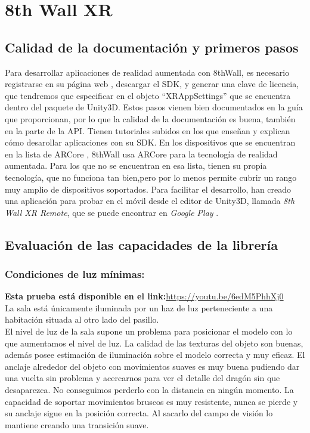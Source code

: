 \section{8th Wall XR}
\subsection{Calidad de la documentación y primeros pasos}
Para desarrollar aplicaciones de realidad aumentada con 8thWall, es necesario registrarse en su página web \cite{8thWall}, descargar el SDK, y generar una clave de licencia, que tendremos que especificar en el objeto ``XRAppSettings'' que se encuentra dentro del paquete de Unity3D. Estos pasos vienen bien documentados en la guía que proporcionan, por lo que la calidad de la documentación es buena, también en la parte de la API. Tienen tutoriales subidos en los que enseñan y explican cómo desarollar aplicaciones con su SDK. En los dispositivos que se encuentran en la lista de ARCore \cite{ARCoreList}, 8thWall usa ARCore para la tecnología de realidad aumentada. Para los que no se encuentran en esa lista, tienen su propia tecnología, que no funciona tan bien,pero por lo menos permite cubrir un rango muy amplio de dispositivos soportados. Para facilitar el desarrollo, han creado una aplicación para probar en el móvil desde el editor de Unity3D, llamada \textit{8th Wall XR Remote}, que se puede encontrar en \textit{Google Play} \cite{8thWallRemote}.
\subsection{Evaluación de las capacidades de la librería}
\subsubsection{Condiciones de luz mínimas:}
\textbf{Esta prueba está disponible en el link:}\url{https://youtu.be/6edM5PhhXj0}\\
La sala está únicamente iluminada por un haz de luz perteneciente a una habitación situada al otro lado del pasillo.\\

El nivel de luz de la sala supone un problema para posicionar el modelo con lo que aumentamos el nivel de luz. La calidad de las texturas del objeto son buenas, además posee estimación de iluminación sobre el modelo correcta y muy eficaz. El anclaje alrededor del objeto con movimientos suaves es muy buena pudiendo dar una vuelta sin problema y acercarnos para ver el detalle del dragón sin que desaparezca. No conseguimos perderlo con la distancia en ningún momento. La capacidad de soportar movimientos bruscos es muy resistente, nunca se pierde y su anclaje sigue en la posición correcta. Al sacarlo del campo de visión lo mantiene creando una transición suave. 

